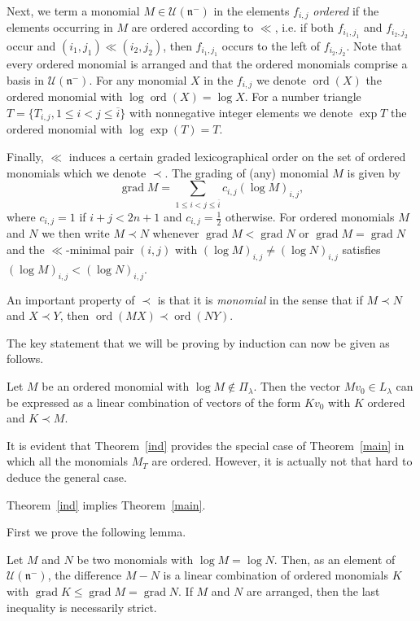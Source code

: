 \documentclass[ALCO,ThmDefs,Unicode]{cedram}
\DeclareMathOperator{\ord}{ord}
\DeclareMathOperator{\grad}{grad}
\newcommand{\la}{\lambda}
\begin{document}
Next, we term a monomial $M\in\mathcal U(\mathfrak n^-)$ in the elements $f_{i,j}$ \emph{ordered} if the elements occurring in $M$ are ordered according to $\ll$, i.e. if both $f_{i_1,j_1}$ and $f_{i_2,j_2}$ occur and $(i_1,j_1)\ll(i_2,j_2)$, then $f_{i_1,j_1}$ occurs to the left of $f_{i_2,j_2}$. Note that every ordered monomial is arranged and that the ordered monomials comprise a basis in $\mathcal U(\mathfrak n^-)$. For any monomial $X$ in the $f_{i,j}$ we denote $\ord(X)$ the ordered monomial with $\log\ord(X)=\log X$. For a number triangle $T=\{T_{i,j},1\le i<j\le\overline i\}$ with nonnegative integer elements we denote $\exp T$ the ordered monomial with $\log\exp(T)=T$.

Finally, $\ll$ induces a certain graded lexicographical order on the set of ordered monomials which we denote $\prec$. The grading of (any) monomial $M$ is given by
\[
\grad M=\sum_{1\le i<j\le \overline i}c_{i,j}(\log M)_{i,j},
\]
where $c_{i,j}=1$ if $i+j<2n+1$ and $c_{i,j}=\frac12$ otherwise. For ordered monomials $M$ and $N$ we then write $M\prec N$ whenever $\grad M<\grad N$ or $\grad M=\grad N$ and the $\ll$-minimal pair $(i,j)$ with $(\log M)_{i,j}\neq(\log N)_{i,j}$ satisfies $(\log M)_{i,j}<(\log N)_{i,j}$.

An important property of $\prec$ is that it is \emph{monomial} in the sense that if $M\prec N$ and $X\prec Y$, then $\ord(MX)\prec\ord(NY)$.

The key statement that we will be proving by induction can now be given as follows.

\begin{theo}\label{ind}
Let $M$ be an ordered monomial with $\log M\notin\Pi_\la$. Then the vector $Mv_0\in L_\la$ can be expressed as a linear combination of vectors of the form $Kv_0$ with $K$ ordered and $K\prec M$.
\end{theo}

It is evident that Theorem~\ref{ind} provides the special case of Theorem~\ref{main} in which all the monomials $M_T$ are ordered. However, it is actually not that hard to deduce the general case.

\begin{prop}\label{implies}
Theorem~\ref{ind} implies Theorem~\ref{main}.
\end{prop}

First we prove the following lemma.

\begin{lemm}\label{reorder}
Let $M$ and $N$ be two monomials with $\log M=\log N$. Then, as an element of $\mathcal U(\mathfrak n^-)$, the difference $M-N$ is a linear combination of ordered monomials $K$ with $\grad K\le \grad M=\grad N$. If $M$ and $N$ are arranged, then the last inequality is necessarily strict.
\end{lemm}
\end{document}

